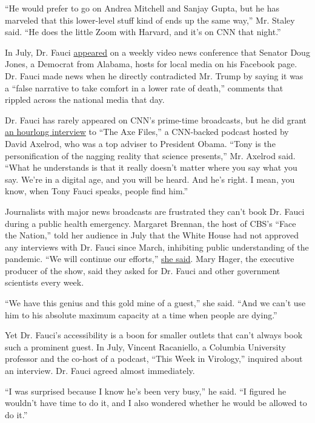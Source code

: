 ``He would prefer to go on Andrea Mitchell and Sanjay Gupta, but he has
marveled that this lower-level stuff kind of ends up the same way,'' Mr.
Staley said. ``He does the little Zoom with Harvard, and it's on CNN
that night.''

In July, Dr. Fauci
\href{https://www.facebookcorewwwi.onion/senatordougjones/videos/913960105743145}{appeared}
on a weekly video news conference that Senator Doug Jones, a Democrat
from Alabama, hosts for local media on his Facebook page. Dr. Fauci made
news when he directly contradicted Mr. Trump by saying it was a ``false
narrative to take comfort in a lower rate of death,'' comments that
rippled across the national media that day.

Dr. Fauci has rarely appeared on CNN's prime-time broadcasts, but he did
grant
\href{https://podcasts.apple.com/us/podcast/ep-396-dr-anthony-fauci/id1043593599?i=1000485884825}{an
hourlong interview} to ``The Axe Files,'' a CNN-backed podcast hosted by
David Axelrod, who was a top adviser to President Obama. ``Tony is the
personification of the nagging reality that science presents,'' Mr.
Axelrod said. ``What he understands is that it really doesn't matter
where you say what you say. We're in a digital age, and you will be
heard. And he's right. I mean, you know, when Tony Fauci speaks, people
find him.''

Journalists with major news broadcasts are frustrated they can't book
Dr. Fauci during a public health emergency. Margaret Brennan, the host
of CBS's ``Face the Nation,'' told her audience in July that the White
House had not approved any interviews with Dr. Fauci since March,
inhibiting public understanding of the pandemic. ``We will continue our
efforts,''
\href{https://www.cbsnews.com/news/full-transcript-of-face-the-nation-on-july-5-2020/}{she
said}. Mary Hager, the executive producer of the show, said they asked
for Dr. Fauci and other government scientists every week.

``We have this genius and this gold mine of a guest,'' she said. ``And
we can't use him to his absolute maximum capacity at a time when people
are dying.''

Yet Dr. Fauci's accessibility is a boon for smaller outlets that can't
always book such a prominent guest. In July, Vincent Racaniello, a
Columbia University professor and the co-host of a podcast, ``This Week
in Virology,'' inquired about an interview. Dr. Fauci agreed almost
immediately.

``I was surprised because I know he's been very busy,'' he said. ``I
figured he wouldn't have time to do it, and I also wondered whether he
would be allowed to do it.''

